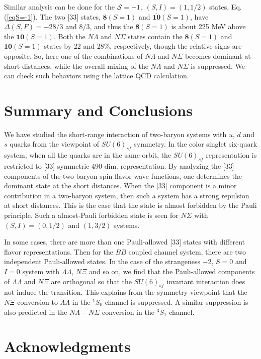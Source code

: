 \documentclass[aps,prd,showpacs,floatfix,reprint,nofootinbib]{revtex4-1}
\newcommand \cc[1]{{\bm {#1}}}
\newcommand \cb[1]{\overline{\bm {#1}}}
\begin{document}
Similar analysis can be done for the ${\cal S}=-1$, $(S, I)=(1,1/2)$ states, Eq.(\ref{eqS=-1}).
The two [33] states, $\cc8 (S=1)$ and $\cb{10}(S=1)$, have $\Delta(S,F)=-28/3$ and $8/3$, and thus
the $\cc8 (S=1)$ is about 225 MeV above the $\cb{10}(S=1)$.
Both the $N\Lambda$ and $N\Sigma$ states contain the $\cc8 (S=1)$ and  $\cb{10}(S=1)$ states by
22 and 28\%, respectively, though the relative signs are opposite.
So, here one of the combinations of $N\Lambda$ and $N\Sigma$ becomes dominant at short distances, 
while the overall mixing of the $N\Lambda$ and $N\Sigma$ is suppressed.
We can check such behaviors using the lattice QCD calculation.

\section{Summary and Conclusions}

We have studied the short-range interaction of two-baryon systems with $u$, $d$ and $s$ quarks 
from the viewpoint of $SU(6)_{sf}$ symmetry.
In the color singlet six-quark system, when all the quarks are in the same orbit, the $SU(6)_{sf}$ representation
is restricted to [33] symmetric 490-dim. representation.
By analyzing the [33] components of the two baryon spin-flavor wave functions, one determines the dominant 
state at the short distances.
When the [33] component is a minor contribution in a two-baryon system, then such a system has a strong repulsion
at short distances. This is the case that the state is almost forbidden by the Pauli principle.
Such a almost-Pauli forbidden state is seen for $N\Sigma$ with $(S,I)=(0,1/2)$ and $(1,3/2)$ systems.

In some cases, there are more than one Pauli-allowed [33] states with different flavor representations.
Then for the $BB$ coupled channel system, there are two independent Pauli-allowed states.
In the case of the strangeness $-2$, $S=0$ and $I=0$ system with $\Lambda\Lambda$, $N\Xi$ and so on, 
we find that the Pauli-allowed components of $\Lambda\Lambda$ and $N\Xi$ are orthogonal so that 
the $SU(6)_{sf}$ invariant interaction does not induce the transition. This explains from the symmetry viewpoint that
the $N\Xi$ conversion to $\Lambda\Lambda$ in the $^1S_0$ channel is suppressed. A similar suppression is also predicted in 
the $N\Lambda-N\Sigma$ conversion in the $^3S_1$ channel.


\section*{Acknowledgments}
\end{document}
